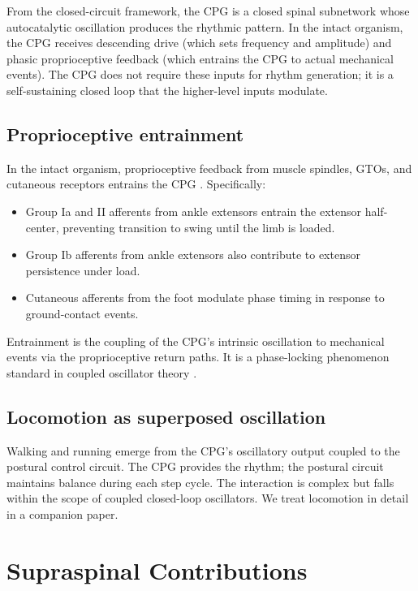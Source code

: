 \documentclass[11pt,twocolumn,a4paper]{article}
\theoremstyle{definition}
\theoremstyle{remark}
\begin{document}
From the closed-circuit framework, the CPG is a closed
spinal subnetwork whose autocatalytic oscillation produces the
rhythmic pattern. In the intact organism, the CPG receives descending
drive (which sets frequency and amplitude) and phasic proprioceptive
feedback (which entrains the CPG to actual mechanical events). The
CPG does not require these inputs for rhythm generation; it is a
self-sustaining closed loop that the higher-level inputs modulate.

\subsection{Proprioceptive entrainment}

In the intact organism, proprioceptive feedback from muscle spindles,
GTOs, and cutaneous receptors entrains the CPG \citep{grillner2003,%
pearson2004}. Specifically:
\begin{itemize}[leftmargin=*,itemsep=1pt]
\item Group Ia and II afferents from ankle extensors entrain the
extensor half-center, preventing transition to swing until the limb
is loaded.
\item Group Ib afferents from ankle extensors also contribute to
extensor persistence under load.
\item Cutaneous afferents from the foot modulate phase timing in
response to ground-contact events.
\end{itemize}
Entrainment is the coupling of the CPG's intrinsic oscillation to
mechanical events via the proprioceptive return paths. It is a
phase-locking phenomenon standard in coupled oscillator theory
\citep{winfree1980,kuramoto1984,strogatz2000}.

\subsection{Locomotion as superposed oscillation}

Walking and running emerge from the CPG's oscillatory output coupled
to the postural control circuit. The CPG provides the rhythm; the
postural circuit maintains balance during each step cycle. The
interaction is complex but falls within the scope of coupled
closed-loop oscillators. We treat locomotion in detail in a companion
paper.


\section{Supraspinal Contributions}
\label{sec:supraspinal}
\end{document}
